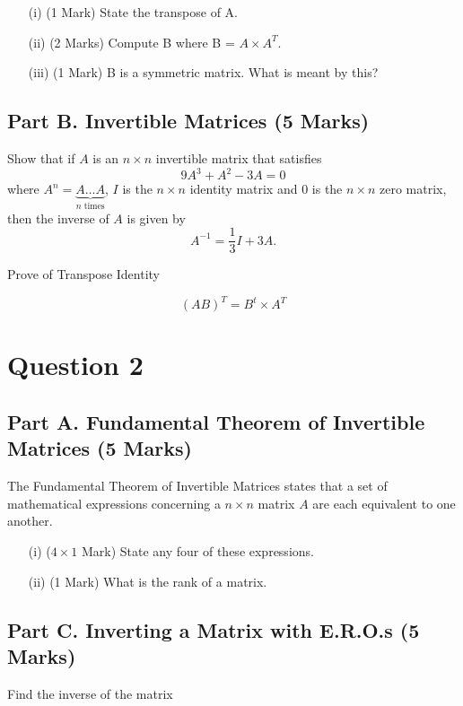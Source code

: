 \documentclass[a4paper,12pt]{article}
\begin{document}
		\begin{itemize}
			\item[(i)] (1 Mark) State the transpose of A.
			\item[(ii)] (2 Marks) Compute B where B = $ A \times A^{T}$. 
			\item[(iii)] (1 Mark) B is a symmetric matrix. What is meant by this?
		\end{itemize}
		\subsection*{Part B. Invertible Matrices (5 Marks)}	
	\noindent	Show that if $A$ is an $n\times n$ invertible matrix that satisfies 
	$$
	9A^3+A^2-3A=0
	$$
	where $A^n=\underbrace{A\ldots A}_{\textrm{$n$ times}}$, %
	$I$ is the $n\times n$  identity matrix and $0$ is the $n\times n$  zero matrix,
	then the inverse of $A$ is given by  %
	$$
	A^{-1}=\frac13I+3A.
	$$
	
\smallskip	
	Prove of Transpose Identity
	
\[	(AB)^{T} = B^t \times A^T\]
\newpage
\section*{Question 2}
	\subsection*{Part A. Fundamental Theorem of Invertible Matrices (5 Marks)}
	The Fundamental Theorem of Invertible Matrices states that a set of mathematical expressions concerning a $n\times n$ matrix $A$ are each equivalent to one another.
	
	\begin{itemize}
		\item[(i)] ($4 \times 1$ Mark)
		State any four of these expressions.
		\item[(ii)] (1 Mark) What is the rank of a matrix.
	\end{itemize}
	
	\subsection*{Part C. Inverting a Matrix with E.R.O.s (5 Marks)}	
	Find the inverse of the  matrix 
	
\end{document}
